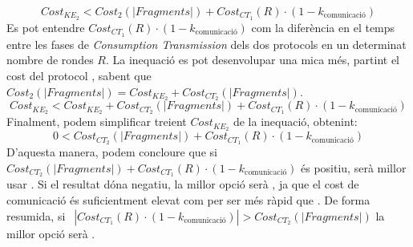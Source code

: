 \[Cost_{KE_2} <  Cost_{2}(|Fragments|) + Cost_{CT_1}(R) \cdot (1 - k_{\textrm{comunicació}})\]
Es pot entendre $Cost_{CT_1}(R) \cdot (1 - k_{\textrm{comunicació}})$ com la diferència en el temps entre les fases de \textit{Consumption Transmission} dels dos protocols en un determinat nombre de rondes $R$. La inequació es pot desenvolupar una mica més, partint el cost del protocol \cite{busom}, sabent que
$Cost_{2}(|Fragments|) = Cost_{KE_2} + Cost_{CT_2}(|Fragments|)$.
\[Cost_{KE_2} <  Cost_{KE_2} + Cost_{CT_2}(|Fragments|) + Cost_{CT_1}(R) \cdot (1 - k_{\textrm{comunicació}})\]
Finalment, podem simplificar treient $Cost_{KE_2}$ de la inequació, obtenint:
\[0 < Cost_{CT_2}(|Fragments|) + Cost_{CT_1}(R) \cdot (1 - k_{\textrm{comunicació}})\]
D'aquesta manera, podem concloure que si $Cost_{CT_2}(|Fragments|) + Cost_{CT_1}(R) \cdot (1 - k_{\textrm{comunicació}})$ és positiu, serà millor usar \cite{ busom}. Si el resultat dóna negatiu, la millor opció serà \cite{recsi}, ja que el cost de comunicació és suficientment elevat com per ser més ràpid que \cite{busom}.  De forma resumida, si $\ \ |Cost_{CT_1}(R) \cdot (1 - k_{\textrm{comunicació}})| > Cost_{CT_2}(|Fragments|)$ la millor opció serà \cite{recsi}.
